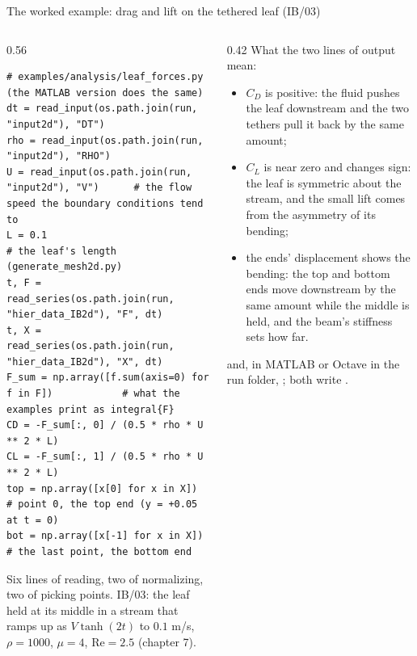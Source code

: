 \documentclass[aspectratio=169,11pt]{beamer}
\begin{document}
\begin{frame}[fragile]{The worked example: drag and lift on the tethered leaf (IB/03)}
\label{fr:leaf1}
\begin{columns}[T,onlytextwidth]
\begin{column}{0.56\textwidth}
\begin{lstlisting}[style=pythontiny]
# examples/analysis/leaf_forces.py (the MATLAB version does the same)
dt = read_input(os.path.join(run, "input2d"), "DT")
rho = read_input(os.path.join(run, "input2d"), "RHO")
U = read_input(os.path.join(run, "input2d"), "V")      # the flow speed the boundary conditions tend to
L = 0.1                                                 # the leaf's length (generate_mesh2d.py)
t, F = read_series(os.path.join(run, "hier_data_IB2d"), "F", dt)
t, X = read_series(os.path.join(run, "hier_data_IB2d"), "X", dt)
F_sum = np.array([f.sum(axis=0) for f in F])            # what the examples print as integral{F}
CD = -F_sum[:, 0] / (0.5 * rho * U ** 2 * L)
CL = -F_sum[:, 1] / (0.5 * rho * U ** 2 * L)
top = np.array([x[0] for x in X])                        # point 0, the top end (y = +0.05 at t = 0)
bot = np.array([x[-1] for x in X])                       # the last point, the bottom end
\end{lstlisting}
\footnotesize Six lines of reading, two of normalizing, two of picking points. IB/03: the leaf held at its middle in a stream that ramps up as $V\tanh(2t)$ to $0.1$ m/s, $\rho = 1000$, $\mu = 4$, $\mathrm{Re} = 2.5$ (chapter 7).
\end{column}
\begin{column}{0.42\textwidth}
\footnotesize What the two lines of output mean:
\begin{itemize}
  \item $C_D$ is positive: the fluid pushes the leaf downstream and the two tethers pull it back by the same amount;
  \item $C_L$ is near zero and changes sign: the leaf is symmetric about the stream, and the small lift comes from the asymmetry of its bending;
  \item the ends' displacement shows the bending: the top and bottom ends move downstream by the same amount while the middle is held, and the beam's stiffness sets how far.
\end{itemize}
\footnotesize {} and, in MATLAB or Octave in the run folder, ; both write .
\end{column}
\end{columns}
\end{frame}
\end{document}
